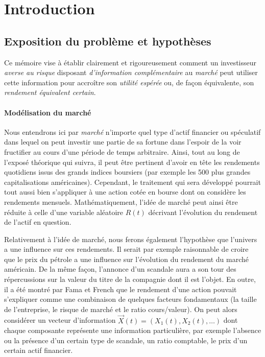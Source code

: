 \section{Introduction}

\subsection{Exposition du problème et hypothèses}

Ce mémoire vise à établir clairement et rigoureusement comment un investisseur
\textit{averse au risque} disposant \textit{d'information complémentaire} au
\textit{marché} peut utiliser cette information pour accroître son \textit{utilité
  espérée} ou, de façon équivalente, son \textit{rendement équivalent certain}.

\paragraph{Modélisation du marché}

Nous entendrons ici par \textit{marché} n'importe quel type d'actif financier ou
spéculatif dans lequel on peut investir une partie de sa fortune dans l'espoir de la voir
fructifier au cours d'une période de temps arbitraire. Ainsi, tout au long de l'exposé
théorique qui suivra, il peut être pertinent d'avoir en tête les rendements quotidiens
issus des grands indices boursiers (par exemple les 500 plus grandes capitalisations
américaines). Cependant, le traitement qui sera développé pourrait tout aussi bien
s'appliquer à une action cotée en bourse dont on considère les rendements mensuels.\nec
Mathématiquement, l'idée de marché peut ainsi être réduite à celle d'une variable
aléatoire $R(t)$ décrivant l'évolution du rendement de l'actif en question.

Relativement à l'idée de marché, nous ferons également l'hypothèse que l'univers a une
influence sur ces rendements. Il serait par exemple raisonnable de croire que le prix du
pétrole a une influence sur l'évolution du rendement du marché américain. De la même
façon, l'annonce d'un scandale aura a son tour des répercussions sur la valeur du titre de
la compagnie dont il est l'objet. En outre, il a été montré par Fama et French que le
rendement d'une action pouvait s'expliquer comme une combinaison de quelques facteurs
fondamentaux (la taille de l'entreprise, le risque de marché et le ratio cours/valeur). On
peut alors considérer un vecteur d'information $\vec X(t) = (X_1(t), X_2(t), \dots)$ dont
chaque composante représente une information particulière, par exemple l'absence ou la
présence d'un certain type de scandale, un ratio comptable, le prix d'un certain actif
financier\reph.

